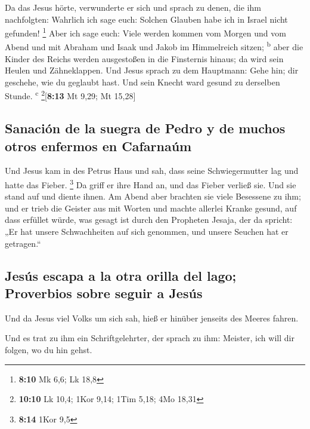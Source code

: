  Da das Jesus hörte, verwunderte er sich und sprach zu
denen, die ihm nachfolgten: Wahrlich ich sage euch: Solchen Glauben habe
ich in Israel nicht gefunden! \footnote{\textbf{8:10} Mk 6,6; Lk 18,8}
 Aber ich sage euch: Viele werden kommen vom Morgen und
vom Abend und mit Abraham und Isaak und Jakob im Himmelreich sitzen;
\textsuperscript{b}  aber die Kinder des Reichs werden
ausgestoßen in die Finsternis hinaus; da wird sein Heulen und
Zähneklappen.  Und Jesus sprach zu dem Hauptmann: Gehe
hin; dir geschehe, wie du geglaubt hast. Und sein Knecht ward gesund zu
derselben Stunde. \textsuperscript{c} \footnote{\textbf{10:10} Lk 10,4;
  1Kor 9,14; 1Tim 5,18; 4Mo 18,31}{[}\textbf{8:13} Mt 9,29; Mt 15,28{]}

\hypertarget{sanaciuxf3n-de-la-suegra-de-pedro-y-de-muchos-otros-enfermos-en-cafarnauxfam}{%
\subsection{Sanación de la suegra de Pedro y de muchos otros enfermos en
Cafarnaúm}\label{sanaciuxf3n-de-la-suegra-de-pedro-y-de-muchos-otros-enfermos-en-cafarnauxfam}}

 Und Jesus kam in des Petrus Haus und sah, dass seine
Schwiegermutter lag und hatte das Fieber. \footnote{\textbf{8:14} 1Kor
  9,5}  Da griff er ihre Hand an, und das Fieber verließ
sie. Und sie stand auf und diente ihnen.  Am Abend aber
brachten sie viele Besessene zu ihm; und er trieb die Geister aus mit
Worten und machte allerlei Kranke gesund,  auf dass
erfüllet würde, was gesagt ist durch den Propheten Jesaja, der da
spricht: „Er hat unsere Schwachheiten auf sich genommen, und unsere
Seuchen hat er getragen.``

\hypertarget{jesuxfas-escapa-a-la-otra-orilla-del-lago-proverbios-sobre-seguir-a-jesuxfas}{%
\subsection{Jesús escapa a la otra orilla del lago; Proverbios sobre
seguir a
Jesús}\label{jesuxfas-escapa-a-la-otra-orilla-del-lago-proverbios-sobre-seguir-a-jesuxfas}}

 Und da Jesus viel Volks um sich sah, hieß er hinüber
jenseits des Meeres fahren.

 Und es trat zu ihm ein Schriftgelehrter, der sprach zu
ihm: Meister, ich will dir folgen, wo du hin gehst.

